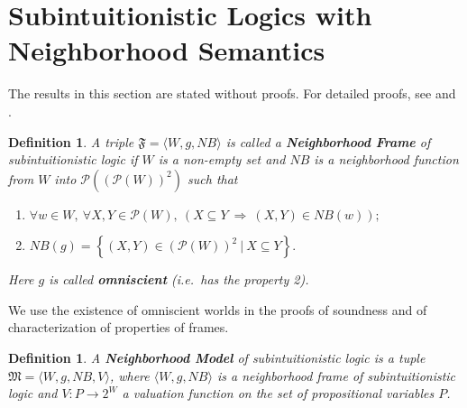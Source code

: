 \documentclass[12pt]{article}
\newtheorem{dfn}[thm]{Definition}
\begin{document}
\section{Subintuitionistic Logics with Neighborhood Semantics}\label{neighbor}



The results in this section are stated without proofs. For detailed proofs, see \cite{FD} and \cite{Dic4}.
\begin{dfn}
\label{11}
A triple $ \mathfrak{F}=\langle W, g, N\!B\rangle $ is called a \textbf{ Neighborhood Frame} of subintuitionistic logic if $W$ is a non-empty set and $N\!B$ is a neighborhood function from $W$ into $ \mathcal{P}((\mathcal{P}(W))^{2} )$ such that
\begin{enumerate}
\item   $\forall w \in W , ~ \forall X, Y \in \mathcal{P}(W), ~(X\subseteq Y~\Rightarrow~(X, Y) \in N\!B(w)); $
\item $ N\!B(g)= \left\lbrace (X, Y) \in (\mathcal{P}(W))^{2}~|~X\subseteq Y\right\rbrace.$
\end{enumerate}
Here $ g $ is called \textbf{omniscient} (i.e.\ has the property 2).
\end{dfn}
We use the existence of omniscient worlds in the proofs of soundness and of characterization of properties of frames.
\begin{dfn}
A \textbf{Neighborhood Model} of subintuitionistic logic is a tuple $\mathfrak{M}= \langle W, g, N\!B, V\rangle $, where $ \langle W, g, N\!B\rangle $ is a neighborhood frame of subintuitionistic logic and $ V: P\rightarrow 2^{W} $ a valuation function on the set of propositional variables $P$.
\end{dfn}
\end{document}
